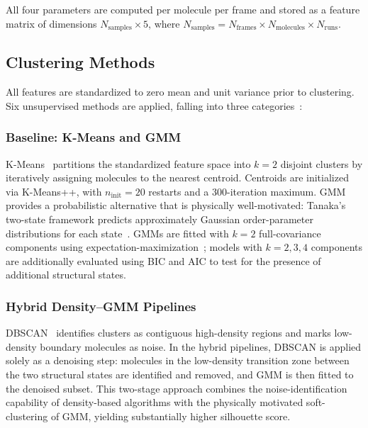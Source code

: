 \documentclass[aps, amsmath,amssymb, reprint, twocolumn,notitlepage,superscriptaddress]{revtex4-2}
\begin{document}
All four parameters are computed per molecule per frame and stored as a feature matrix of dimensions $N_{\text{samples}} \times 5$, where $N_{\text{samples}} = N_{\text{frames}} \times N_{\text{molecules}} \times N_{\text{runs}}$.

\subsection{Clustering Methods}
\label{sec:clustering_algorithm}
All features are standardized to zero mean and unit variance prior to clustering. Six unsupervised methods are applied, falling into three categories~\cite{zheng-2018}:

\subsubsection{Baseline: K-Means and GMM}
K-Means~\cite{ikotun_k-means_2023} partitions the standardized feature space into $k=2$ disjoint clusters by iteratively assigning molecules to the nearest centroid. Centroids are initialized via K-Means++, with $n_{\text{init}} = 20$ restarts and a 300-iteration maximum. GMM~\cite{deprez-2024} provides a probabilistic alternative that is physically well-motivated: Tanaka's two-state framework predicts approximately Gaussian order-parameter distributions for each state~\cite{shi_direct_2020}. GMMs are fitted with $k=2$ full-covariance components using expectation-maximization~\cite{dempster_maximum_1977}; models with $k=2,3,4$ components are additionally evaluated using BIC and AIC to test for the presence of additional structural states.

\subsubsection{Hybrid Density--GMM Pipelines}
DBSCAN~\cite{ester_density-based_1996} identifies clusters as contiguous high-density regions and marks low-density boundary molecules as noise. In the hybrid pipelines, DBSCAN is applied solely as a denoising step: molecules in the low-density transition zone between the two structural states are identified and removed, and GMM is then fitted to the denoised subset. This two-stage approach combines the noise-identification capability of density-based algorithms with the physically motivated soft-clustering of GMM, yielding substantially higher silhouette score.
\end{document}
